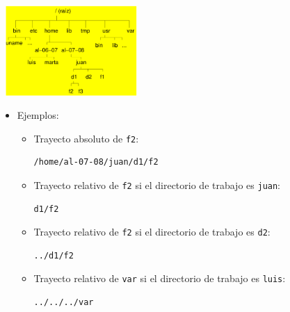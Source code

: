 \documentclass[ucs]{beamer}
\begin{document}
\begin{frame}[fragile]

  \begin{minipage}{4cm}
    ~\hspace{-1cm}\includegraphics[width=5cm]{figs/unix-tree-2}
  \end{minipage}
  \begin{minipage}{5.5cm}
  \begin{itemize}
  \item Ejemplos:
    \begin{footnotesize}
      \begin{itemize}
      \item Trayecto absoluto de \verb|f2|:
\begin{verbatim}
/home/al-07-08/juan/d1/f2
\end{verbatim}
      \item Trayecto relativo de \verb|f2| si el directorio de trabajo es \verb|juan|:
\begin{verbatim}
d1/f2
\end{verbatim}
      \item Trayecto relativo de \verb|f2| si el directorio de trabajo es \verb|d2|:
\begin{verbatim}
../d1/f2
\end{verbatim}
      \item Trayecto relativo de \verb|var| si el directorio de trabajo es \verb|luis|:
\begin{verbatim}
../../../var
\end{verbatim}



      \end{itemize}
    \end{footnotesize}    
  \end{itemize}
  \end{minipage}


\end{frame}



\end{document}
